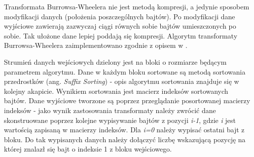
Transformata Burrowsa-Wheelera nie jest metodą kompresji, a jedynie
sposobem modyfikacji danych (położenia poszczególnych bajtów). Po
modyfikacji dane wyjściowe zawierają zazwyczaj ciągi równych sobie
bajtów umieszczonych po sobie. Tak ułożone dane lepiej poddają się
kompresji. Algorytm transformaty Burrowsa-Wheelera zaimplementowano
zgodnie z opisem w \cite{kompresja}.

Strumień danych wejściowych dzielony jest na bloki o rozmiarze będącym
parametrem algorytmu. Dane w każdym bloku sortowane są metodą sortowania
przedrostków (ang. \emph{Suffix Sorting}) - opis algorytmu sortowania
znajduje się w kolejny akapicie. Wynikiem sortowania jest macierz
indeksów sortowanych bajtów. Dane wyjściowe tworzone są poprzez przeglądanie
posortowanej macierzy indeksów - jako wynik zastosowania transformaty
należy zwrócić dane skonstruowane poprzez kolejne wypisywanie bajtów
z pozycji \emph{i-1}, gdzie \emph{i} jest wartością zapisaną w macierzy
indeksów. Dla \emph{i=0} należy wypisać ostatni bajt z bloku. Do tak
wypisanych danych należy dołączyć liczbę wskazującą pozycję na której
znalazł się bajt o indeksie 1 z bloku wejściowego.

